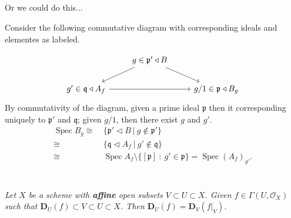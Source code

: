 \subsection{}

Or we could do this...

Consider the following commutative diagram with corresponding ideals and elementes as labeled.

\[\begin{tikzcd}
	& {g\in\mathfrak p'\triangleleft B} \\
	{g'\in\mathfrak q\triangleleft A_f} && {g/1\in\mathfrak p\triangleleft B_g}
	\arrow[from=1-2, to=2-1]
	\arrow[from=1-2, to=2-3]
	\arrow[from=2-1, to=2-3]
\end{tikzcd}\]
By commutativity of the diagram, given a prime ideal $\mathfrak p$ then it corresponding uniquely to $\mathfrak p'$ and $\mathfrak q$; given $g/1$, then there exist $g$ and $g'$.
\begin{align*}
	\operatorname{Spec}B_g 
	\cong &~ \{\mathfrak p'\triangleleft B ~\vert~ g\notin \mathfrak p'\}\\
	\cong &~ \{\mathfrak q\triangleleft A_f ~\vert~ g'\notin \mathfrak q\}\\
	\cong &~ \operatorname{Spec}A_f\setminus \{[\mathfrak p] ~:~ g'\in \mathfrak p\}=\operatorname{Spec}(A_f)_{g'}.
\end{align*}

\section{}
\textit{Let $X$ be a scheme with \textbf{affine} open subsets $V\subset U\subset X$. Given $f\in \Gamma (U,\mathcal O_X)$ such that $\mathbf D_U(f)\subset V\subset U\subset X$. Then $\mathbf D_U(f)=\mathbf D_V(f\vert_V)$.}
\begin{comment}
\begin{proof}
It suffices to check $\mathbf V_U(f)=\mathbf V_V(f\vert_V)$. 
\begin{align*}
	\mathbf V_U(f) = &~ \{\mathfrak p\in U ~\vert~ f\in\mathfrak p\}\\
	= &~ \{\mathfrak p\in V ~\vert~ f\vert_V\in \mathfrak p\}\\
	= &~ \mathbf V_V(f\vert_V)
\end{align*}
\end{proof}
\end{comment}

